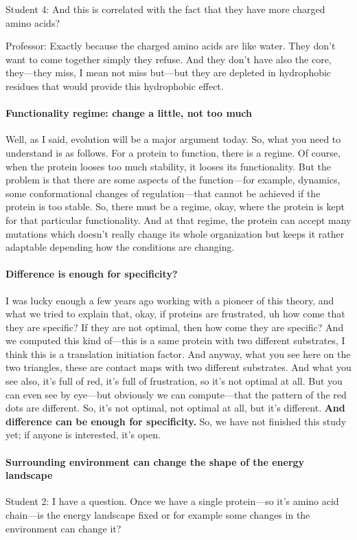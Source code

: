 Student 4: And this is correlated with the fact that they have more charged amino acids?

Professor: Exactly because the charged amino acids are like water. They don’t want to come together simply they refuse. And they don’t have also the core, they—they miss, I mean not miss but—but they are depleted in hydrophobic residues that would provide this hydrophobic effect.


\paragraph{Functionality regime: change a little, not too much}
Well, as I said, evolution will be a major argument today. So, what you need to understand is as follows. For a protein to function, there is a regime. Of course, when the protein looses too much stability, it looses its functionality. But the problem is that there are some aspects of the function—for example, dynamics, some conformational changes of regulation—that cannot be achieved if the protein is too stable. So, there must be a regime, okay, where the protein is kept for that particular functionality. And at that regime, the protein can accept many mutations which doesn't really change its whole organization but keeps it rather adaptable depending how the conditions are changing.

\paragraph{Difference is enough for specificity? }
I was lucky enough a few years ago working with a pioneer of this theory, and what we tried to explain that, okay, if proteins are frustrated, uh how come that they are specific? If they are not optimal, then how come they are specific? And we computed this kind of—this is a same protein with two different substrates, I think this is a translation initiation factor. And anyway, what you see here on the two triangles, these are contact maps with two different substrates. And what you see also, it's full of red, it’s full of frustration, so it's not optimal at all. But you can even see by eye—but obviously we can compute—that the pattern of the red dots are different. So, it's not optimal, not optimal at all, but it's different. \textbf{And difference can be enough for specificity.} So, we have not finished this study yet; if anyone is interested, it's open.


\paragraph{Surrounding environment can change the shape of the energy landscape}
Student 2: I have a question. Once we have a single protein—so it’s amino acid chain—is the energy landscape fixed or for example some changes in the environment can change it?

